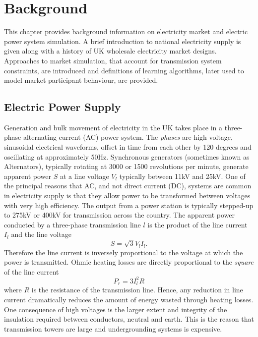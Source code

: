 \chapter{Background}
\label{ch:background}
This chapter provides background information on electricity market and
electric power system simulation. A brief introduction to national electricity supply is given along with a history of UK wholesale
electricity market designs.  Approaches to market simulation, that account
for transmission system constraints, are introduced and definitions of
learning algorithms, later used to model market participant behaviour, are
provided.

\section{Electric Power Supply}


Generation and bulk movement of electricity in the UK takes place in a
three-phase alternating current (AC) power system.  The \textit{phases} are
high voltage, sinusoidal electrical waveforms, offset in time from each
other by 120 degrees and oscillating at approximately 50Hz.
Synchronous generators (sometimes known as Alternators), typically rotating at
3000 or 1500 revolutions per minute, generate apparent power $S$ at a line
voltage $V_l$ typically between 11kV and 25kV.  One of the principal reasons
that AC, and not direct current (DC), systems are common in electricity supply is that they allow power to be transformed between voltages
with very high efficiency. The output from a power station is typically
stepped-up to 275kV or 400kV for transmission across the country.
The apparent power conducted by a three-phase transmission line $l$ is the product of the line current $I_l$ and the line voltage
\begin{equation}
S = \sqrt{3} V_l I_l .
\end{equation}
Therefore the line current is inversely proportional to the voltage at which
the power is transmitted. Ohmic heating losses are directly proportional to the
\textit{square} of the line current
\begin{equation}
P_{r} = 3 I_l^2 R
\end{equation}
where $R$ is the resistance of the transmission line.  Hence, any reduction in
line current dramatically reduces the amount of energy wasted through heating
losses.  One consequence of high voltages is the larger extent and integrity
of the insulation required between conductors, neutral and earth.  This is the
reason that transmission towers are large and undergrounding systems is
expensive.

